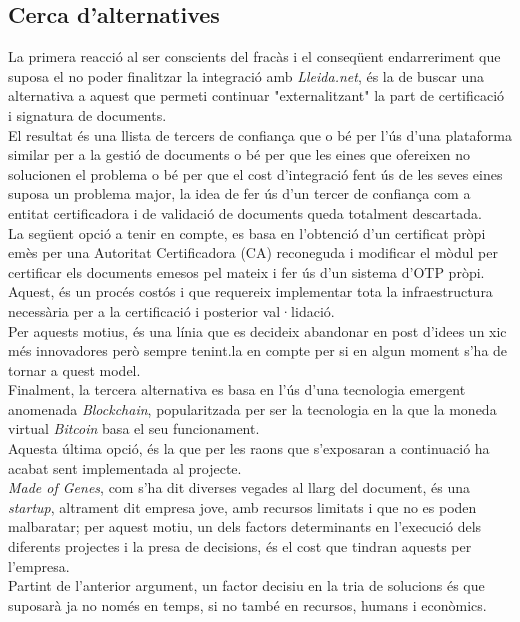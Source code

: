 \subsection{Cerca d'alternatives}
La primera reacció al ser conscients del fracàs i el conseqüent endarreriment que suposa el no poder finalitzar la integració amb \textit{Lleida.net}, és la de buscar una alternativa a aquest que permeti continuar "externalitzant" la part de certificació i signatura de documents.\\
El resultat és una llista de tercers de confiança que o bé per l'ús d'una plataforma similar per a la gestió de documents o bé per que les eines que ofereixen no solucionen el problema o bé per que el cost d'integració fent ús de les seves eines suposa un problema major, la idea de fer ús d'un tercer de confiança com a entitat certificadora i de validació de documents queda totalment descartada.\\
\newline La següent opció a tenir en compte, es basa en l'obtenció d'un certificat pròpi emès per una Autoritat Certificadora (CA) reconeguda i modificar el mòdul per certificar els documents emesos pel mateix i fer ús d'un sistema d'OTP pròpi.\\
Aquest, és un procés costós i que requereix implementar tota la infraestructura necessària per a la certificació i posterior val·lidació.\\
Per aquests motius, és una línia que es decideix abandonar en post d'idees un xic més innovadores però sempre tenint.la en compte per si en algun moment s'ha de tornar a quest model.\\
\newline Finalment, la tercera alternativa es basa en l'ús d'una tecnologia emergent anomenada \textit{Blockchain}, popularitzada per ser la tecnologia en la que la moneda virtual \textit{Bitcoin} basa el seu funcionament.\\
Aquesta última opció, és la que per les raons que s'exposaran a continuació ha acabat sent implementada al projecte.\\
\newline \textit{Made of Genes}, com s'ha dit diverses vegades al llarg del document, és una \textit{startup}, altrament dit empresa jove, amb recursos limitats i que no es poden malbaratar; per aquest motiu, un dels factors determinants en l'execució dels diferents projectes i la presa de decisions, és el cost que tindran aquests per l'empresa.\\
Partint de l'anterior argument, un factor decisiu en la tria de solucions és que suposarà ja no només en temps, si no també en recursos, humans i econòmics.\\

